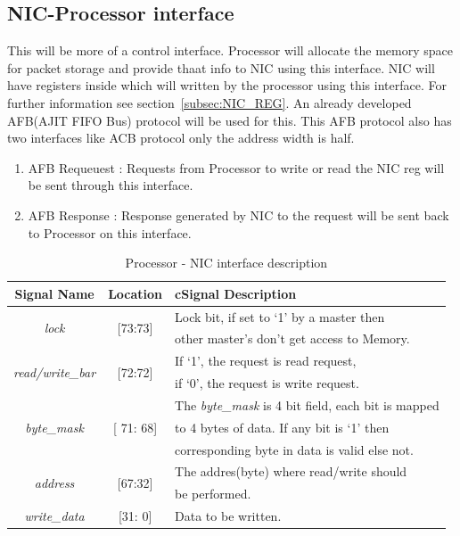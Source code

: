 \documentclass[12pt]{report}
\begin{document}
\begin{appendices}
		\subsection{NIC-Processor interface} \label{AFB}
			This will be more of a control interface. Processor will allocate the memory space for packet storage and provide thaat info to NIC using this interface.
			NIC will have registers inside which will written by the processor using this interface. For further information see section~\ref{subsec:NIC_REG}. An already developed
			AFB(AJIT FIFO Bus) protocol will be used for this. This AFB protocol also has two interfaces like ACB protocol only the address width is half.

			\begin{enumerate}
				\item AFB Requeuest : Requests from Processor to write or read the NIC reg will be sent through this interface. 
				\item AFB Response : Response generated by NIC to the request will be sent back to Processor on this interface.
			\end{enumerate}

				\begin{table}[h]
					\centering
					\begin{tabular}{ccl}
						\hline
						\textbf{Signal Name} 			& \textbf{Location} 		&{c}\textbf{Signal Description}  \\ \hline
						\multirow{2}{*}{\textit{lock}}		& \multirow{2}{*}{[73:73]}	& Lock bit, if set to `1' by a master then\\
											&				& other master's don't get access to Memory.\\ \hline
						\multirow{2}{*}{\textit{read/write\_bar}}& \multirow{2}{*}{[72:72]}	& If `1', the request is read request,\\ 
											& 				& if `0', the request is write request.\\ \hline
						\multirow{3}{*}{\textit{byte\_mask}}	& \multirow{3}{*}{[ 71: 68]}	& The \textit{byte\_mask} is 4 bit field, each bit is mapped\\
											&				& to 4 bytes of data. If any bit is `1' then\\
											& 				& corresponding byte in data is valid else not.\\ \hline 
						\multirow{2}{*}{\textit{address}}   	& \multirow{2}{*}{[67:32]} 	& The addres(byte) where read/write should\\ 
											&				& be performed.\\ \hline
						\textit{write\_data}   			& [31: 0] 			& Data to be written.\\ \hline
					\end{tabular}
					\caption{Processor - NIC interface description}
					\label{tab:Proc-NIC-interface-req}
				\end{table}


\end{appendices}
\end{document}
